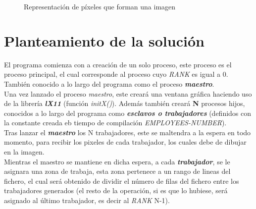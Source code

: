 \documentclass[11pt]{article}
\begin{document}
\begin{figure}[H]
  \centering
  \caption{Representación de píxeles que forman una imagen}
  \label{fig:intro}
\end{figure}

\clearpage


\section{Planteamiento de la solución}
El programa comienza con a creación de un solo proceso, este proceso es el proceso principal, el cual corresponde al proceso cuyo \textit{RANK} es igual a 0. También conocido a lo largo del programa como el proceso \textbf{\textit{maestro}}.\\
Una vez lanzado el proceso \textit{maestro}, este creará una ventana gráfica haciendo uso de la librería \textit{\textbf{lX11}} (función \textit{initX()}). Además también creará \textbf{N} procesos hijos, conocidos a lo largo del programa como \textit{\textbf{esclavos o trabajadores}} (definidos con la constante creada eb tiempo de compilación \textit{EMPLOYEES-NUMBER}).\\

Tras lanzar el \textit{\textbf{maestro}} los N trabajadores, este se maltendra a la espera en todo momento, para recibir los pixeles de cada trabajador, los cuales debe de dibujar en la imagen.\\
Mientras el maestro se mantiene en dicha espera, a cada \textit{\textbf{trabajador}}, se le asignara una zona de trabaja, esta zona pertenece a un rango de lineas del fichero, el cual será obtenido de dividir el número de filas del fichero entre los trabajadores generados (el resto de la operación, si es que lo hubiese, será asignado al último trabajador, es decir al \textit{RANK} N-1).
\end{document}
